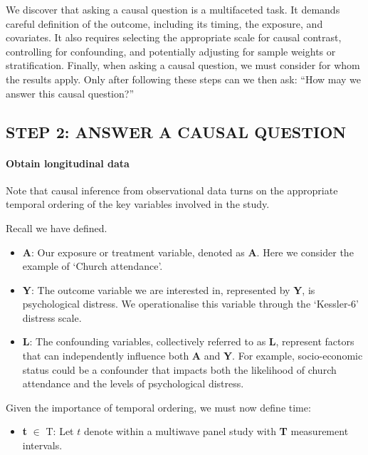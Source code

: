 \documentclass[
  singlecolumn]{article}
\let\oldparagraph\paragraph
\renewcommand{\paragraph}[1]{\oldparagraph{#1}\mbox{}}
\providecommand{\tightlist}{%
  \setlength{\itemsep}{0pt}\setlength{\parskip}{0pt}}\usepackage{longtable,booktabs,array}
\begin{document}
We discover that asking a causal question is a multifaceted task. It
demands careful definition of the outcome, including its timing, the
exposure, and covariates. It also requires selecting the appropriate
scale for causal contrast, controlling for confounding, and potentially
adjusting for sample weights or stratification. Finally, when asking a
causal question, we must consider for whom the results apply. Only after
following these steps can we then ask: ``How may we answer this causal
question?''

\hypertarget{step-2-answer-a-causal-question}{%
\subsection{STEP 2: ANSWER A CAUSAL
QUESTION}\label{step-2-answer-a-causal-question}}

\hypertarget{obtain-longitudinal-data}{%
\paragraph{Obtain longitudinal data}\label{obtain-longitudinal-data}}

Note that causal inference from observational data turns on the
appropriate temporal ordering of the key variables involved in the
study.

Recall we have defined.

\begin{itemize}
\item
  \textbf{A}: Our exposure or treatment variable, denoted as \textbf{A}.
  Here we consider the example of `Church attendance'.
\item
  \textbf{Y}: The outcome variable we are interested in, represented by
  \textbf{Y}, is psychological distress. We operationalise this variable
  through the `Kessler-6' distress scale.
\item
  \textbf{L}: The confounding variables, collectively referred to as
  \textbf{L}, represent factors that can independently influence both
  \textbf{A} and \textbf{Y}. For example, socio-economic status could be
  a confounder that impacts both the likelihood of church attendance and
  the levels of psychological distress.
\end{itemize}

Given the importance of temporal ordering, we must now define time:

\begin{itemize}
\tightlist
\item
  \textbf{t} \(\in\) T: Let \(t\) denote within a multiwave panel study
  with \textbf{T} measurement intervals.
\end{itemize}
\end{document}
